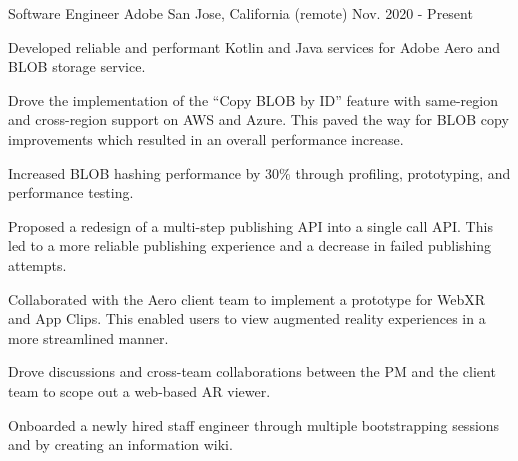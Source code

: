 


\begin{cventries}


\cventry
{Software Engineer} %
{Adobe} %
{San Jose, California (remote)} %
{Nov. 2020 - Present} %
{ %
\begin{cvitems}
\item {Developed reliable and performant Kotlin and Java services for Adobe Aero and BLOB storage service.}
\item {Drove the implementation of the ``Copy BLOB by ID'' feature with same-region and cross-region support on AWS and Azure. This paved the way for BLOB copy improvements which resulted in an overall performance increase.}
\item {Increased BLOB hashing performance by 30\% through profiling, prototyping, and performance testing.}
\item {Proposed a redesign of a multi-step publishing API into a single call API. This led to a more reliable publishing experience and a decrease in failed publishing attempts.}
\item {Collaborated with the Aero client team to implement a prototype for WebXR and App Clips. This enabled users to view augmented reality experiences in a more streamlined manner.}
\item {Drove discussions and cross-team collaborations between the PM and the client team to scope out a web-based AR viewer.}
\item {Onboarded a newly hired staff engineer through multiple bootstrapping sessions and by creating an information wiki.}
\end{cvitems}
}



\end{cventries}
